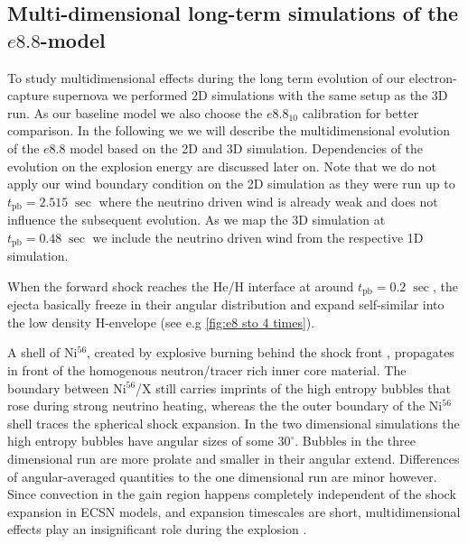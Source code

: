 \documentclass[fleqn,usenatbib]{mnras}
\newcommand{\tpb}{\ensuremath{t_\mathrm{pb}}}
\newcommand{\nickel}{$\mathrm{Ni^{56}}$\xspace}
\newcommand{\tracer}{$\mathrm{X}$\xspace}
\begin{document}
\subsection{Multi-dimensional long-term simulations of the $e8.8$-model}
To study multidimensional effects during the long term evolution of our electron-capture supernova we performed 2D simulations with the same setup as the 3D run. As our baseline model we also choose the $e8.8_{10}$ calibration for better comparison. In the following we we will describe the multidimensional evolution of the $e8.8$ model based on the 2D and 3D simulation. Dependencies of the evolution on the explosion energy are discussed later on.
Note that we do not apply our wind boundary condition on the 2D simulation as they were run up to $\tpb=2.515\;\sec$ where the neutrino driven wind is already weak and does not influence the subsequent evolution. As we map the 3D simulation at $\tpb=0.48\;\sec$ we include the neutrino driven wind from the respective 1D simulation.

When the forward shock reaches the He/H interface at around $\tpb=0.2\;\sec$, the ejecta basically freeze in their angular distribution and expand self-similar into the low density H-envelope (see e.g \autoref{fig:e8 sto 4 times}). 

A shell of \nickel, created by explosive burning behind the shock front \citep{Kifonidis2006}, propagates in front of the homogenous neutron/tracer rich inner core material. The boundary between \nickel/\tracer still carries imprints of the high entropy bubbles that rose during strong neutrino heating, whereas the the outer boundary of the \nickel shell traces the spherical shock expansion. In the two dimensional simulations the high entropy bubbles have angular sizes of some $30^{\circ}$. Bubbles in the three dimensional run are more prolate and smaller in their angular extend. 
Differences of angular-averaged quantities to the one dimensional run are minor however. Since convection in the gain region happens completely independent of the shock expansion in ECSN models, and expansion timescales are short, multidimensional effects play an insignificant role during the explosion  \citep{Janka2008}. 
\end{document}
